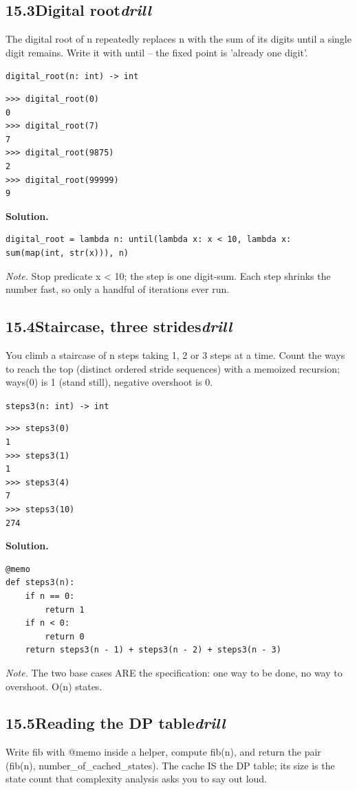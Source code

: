 \documentclass[10pt,letterpaper]{book}
\begin{document}
\subsection*{15.3\quad Digital root\hfill\textnormal{\textit{drill}}}
The digital root of n repeatedly replaces n with the sum of its digits until a single digit remains. Write it with until -- the fixed point is 'already one digit'.

\noindent\texttt{digital\_root(n: int) -> int}
\begin{lstlisting}[style=ex]
>>> digital_root(0)
0
>>> digital_root(7)
7
>>> digital_root(9875)
2
>>> digital_root(99999)
9
\end{lstlisting}
\noindent\textbf{Solution.}
\begin{lstlisting}[style=code]
digital_root = lambda n: until(lambda x: x < 10, lambda x: sum(map(int, str(x))), n)
\end{lstlisting}
\noindent\textit{Note.} Stop predicate x < 10; the step is one digit-sum. Each step shrinks the number fast, so only a handful of iterations ever run.

\subsection*{15.4\quad Staircase, three strides\hfill\textnormal{\textit{drill}}}
You climb a staircase of n steps taking 1, 2 or 3 steps at a time. Count the ways to reach the top (distinct ordered stride sequences) with a memoized recursion; ways(0) is 1 (stand still), negative overshoot is 0.

\noindent\texttt{steps3(n: int) -> int}
\begin{lstlisting}[style=ex]
>>> steps3(0)
1
>>> steps3(1)
1
>>> steps3(4)
7
>>> steps3(10)
274
\end{lstlisting}
\noindent\textbf{Solution.}
\begin{lstlisting}[style=code]
@memo
def steps3(n):
    if n == 0:
        return 1
    if n < 0:
        return 0
    return steps3(n - 1) + steps3(n - 2) + steps3(n - 3)
\end{lstlisting}
\noindent\textit{Note.} The two base cases ARE the specification: one way to be done, no way to overshoot. O(n) states.

\subsection*{15.5\quad Reading the DP table\hfill\textnormal{\textit{drill}}}
Write fib with @memo inside a helper, compute fib(n), and return the pair (fib(n), number\_of\_cached\_states). The cache IS the DP table; its size is the state count that complexity analysis asks you to say out loud.
\end{document}

